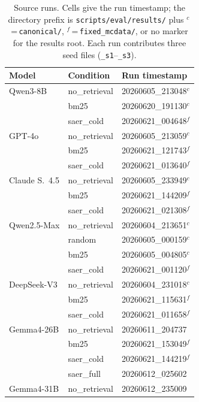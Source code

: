 \documentclass[letterpaper]{article} %
\begin{document}
\begin{table}[tbp]
\centering
\caption{Source runs.  Cells give the run timestamp; the directory
prefix is \texttt{scripts/\allowbreak eval/\allowbreak results/} plus $^{c}$\,=\,\texttt{canonical/},
$^{f}$\,=\,\texttt{fixed\_mcdata/}, or no marker for the results root.
Each run contributes three seed files (\texttt{\_s1}--\texttt{\_s3}).}
\label{tab:provenance}
\scriptsize
\begin{tabular}{@{}lll@{}}
\toprule
Model & Condition & Run timestamp \\
\midrule
Qwen3-8B      & no\_retrieval & 20260605\_213048$^{c}$ \\
              & bm25          & 20260620\_191130$^{c}$ \\
              & saer\_cold    & 20260621\_004648$^{f}$ \\
GPT-4o        & no\_retrieval & 20260605\_213059$^{c}$ \\
              & bm25          & 20260621\_121743$^{f}$ \\
              & saer\_cold    & 20260621\_013640$^{f}$ \\
Claude S.~4.5 & no\_retrieval & 20260605\_233949$^{c}$ \\
              & bm25          & 20260621\_144209$^{f}$ \\
              & saer\_cold    & 20260621\_021308$^{f}$ \\
Qwen2.5-Max   & no\_retrieval & 20260604\_213651$^{c}$ \\
              & random        & 20260605\_000159$^{c}$ \\
              & bm25          & 20260605\_004805$^{c}$ \\
              & saer\_cold    & 20260621\_001120$^{f}$ \\
DeepSeek-V3   & no\_retrieval & 20260604\_231018$^{c}$ \\
              & bm25          & 20260621\_115631$^{f}$ \\
              & saer\_cold    & 20260621\_011658$^{f}$ \\
Gemma4-26B    & no\_retrieval & 20260611\_204737 \\
              & bm25          & 20260621\_153049$^{f}$ \\
              & saer\_cold    & 20260621\_144219$^{f}$ \\
              & saer\_full    & 20260612\_025602 \\
Gemma4-31B    & no\_retrieval & 20260612\_235009 \\

\end{tabular}
\end{table}
\end{document}
